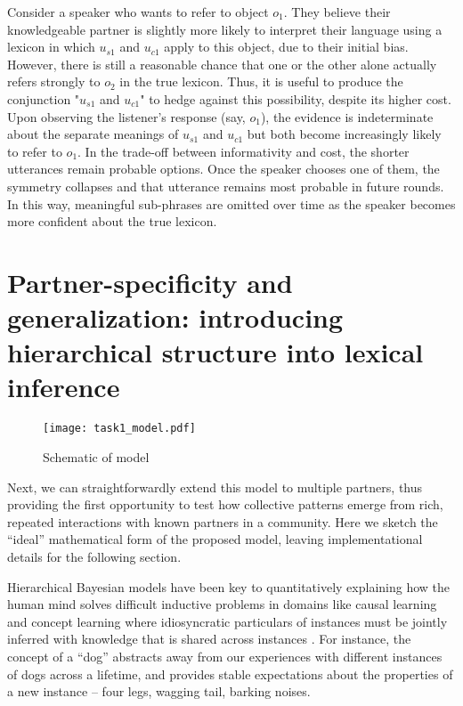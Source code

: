 Consider a speaker who wants to refer to object $o_1$. They believe their knowledgeable partner is slightly more likely to interpret their language using a lexicon in which $u_{s1}$ and $u_{c1}$ apply to this object, due to their initial bias. However, there is still a reasonable chance that one or the other alone actually refers strongly to $o_2$ in the true lexicon. Thus, it is useful to produce the conjunction "$u_{s1}$ and $u_{c1}$" to hedge against this possibility, despite its higher cost. Upon observing the listener's response (say, $o_1$), the evidence is indeterminate about the separate meanings of $u_{s1}$ and $u_{c1}$ but both become increasingly likely to refer to $o_1$. In the trade-off between informativity and cost, the shorter utterances remain probable options. Once the speaker chooses one of them, the symmetry collapses and that utterance remains most probable in future rounds. In this way, meaningful sub-phrases are omitted over time as the speaker becomes more confident about the true lexicon. 

\section{Partner-specificity and generalization: introducing hierarchical structure into lexical inference}

\begin{figure}
\centering
    \texttt{[image: task1\_model.pdf]}
  \caption{Schematic of model}
  \label{fig:task1model}
\end{figure}

Next, we can straightforwardly extend this model to multiple partners, thus providing the first opportunity to test how collective patterns emerge from rich, repeated interactions with known partners in a community. 
Here we sketch the ``ideal'' mathematical form of the proposed model, leaving implementational details for the following section.

Hierarchical Bayesian models have been key to quantitatively explaining how the human mind solves difficult inductive problems in domains like causal learning and concept learning where idiosyncratic particulars of instances must be jointly inferred with knowledge that is shared across instances .
For instance, the concept of a ``dog'' abstracts away from our experiences with different instances of dogs across a lifetime, and provides stable expectations about the properties of a new instance -- four legs, wagging tail, barking noises.

